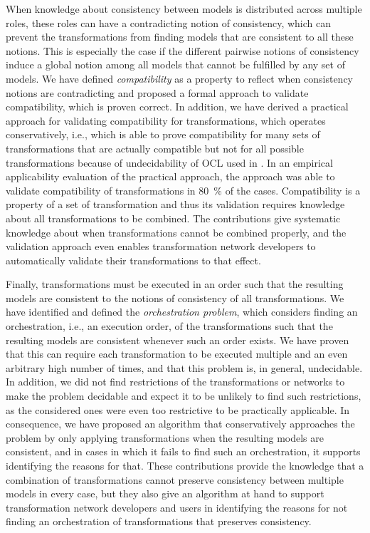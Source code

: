 When knowledge about consistency between models is distributed across multiple roles, these roles can have a contradicting notion of consistency, which can prevent the transformations from finding models that are consistent to all these notions.
This is especially the case if the different pairwise notions of consistency induce a global notion among all models that cannot be fulfilled by any set of models.
We have defined \emph{compatibility} as a property to reflect when consistency notions are contradicting and proposed a formal approach to validate compatibility, which is proven correct.
In addition, we have derived a practical approach for validating compatibility for \qvtr transformations, which operates conservatively, i.e., which is able to prove compatibility for many sets of transformations that are actually compatible but not for all possible transformations because of undecidability of \gls{OCL} used in \qvtr.
In an empirical applicability evaluation of the practical approach, the approach was able to validate compatibility of transformations in \SI{80}{\percent} of the cases.
Compatibility is a property of a set of transformation and thus its validation requires knowledge about all transformations to be combined.
The contributions give systematic knowledge about when transformations cannot be combined properly, and the validation approach even enables transformation network developers to automatically validate their transformations to that effect.

Finally, transformations must be executed in an order such that the resulting models are consistent to the notions of consistency of all transformations.
We have identified and defined the \emph{orchestration problem}, which considers finding an orchestration, i.e., an execution order, of the transformations such that the resulting models are consistent whenever such an order exists.
We have proven that this can require each transformation to be executed multiple and an even arbitrary high number of times, and that this problem is, in general, undecidable.
In addition, we did not find restrictions of the transformations or networks to make the problem decidable and expect it to be unlikely to find such restrictions, as the considered ones were even too restrictive to be practically applicable.
In consequence, we have proposed an algorithm that conservatively approaches the problem by only applying transformations when the resulting models are consistent, and in cases in which it fails to find such an orchestration, it supports identifying the reasons for that.
These contributions provide the knowledge that a combination of transformations cannot preserve consistency between multiple models in every case, but they also give an algorithm at hand to support transformation network developers and users in identifying the reasons for not finding an orchestration of transformations that preserves consistency.

